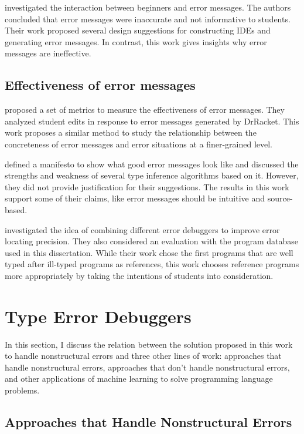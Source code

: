 \documentclass[12pt]{report}	%
\begin{document}
\cite{marceau2011mind} investigated the interaction between
beginners and error messages.
The authors concluded that error messages were
inaccurate and not informative to students.
Their work proposed several design
suggestions for constructing IDEs and generating
error messages.
In contrast, this work gives insights
why error messages are ineffective.

\subsection{Effectiveness of error messages}

\cite{marceau2011measuring} proposed a set of metrics to
measure the effectiveness of
error messages.
They analyzed student edits
in response to error messages generated by DrRacket.
This work proposes a similar method to study
the relationship between
the concreteness of error messages and
error situations at a finer-grained level.

\cite{yang2000improved} defined a manifesto to show
what good error messages look like and discussed
the strengths and weakness of several type inference
algorithms based on it.
However, they did not provide justification
for their suggestions.
The results in this work support some of their claims,
like error messages
should be intuitive and source-based.

\cite{chen2014let} investigated the idea
of combining different error debuggers to improve
error locating precision. They also considered
an evaluation with the program database used
in this dissertation. While their work
chose the first programs that are well typed after
ill-typed programs as references, this work chooses
reference programs more appropriately by taking the
intentions of students into consideration.

\section{Type Error Debuggers}
\label{sec:reivew:debugger}

In this section, I discuss the relation between the solution proposed in this work to handle nonstructural errors and
three other lines of work: approaches that handle nonstructural errors, approaches that don't handle nonstructural errors,
and other applications of machine learning to solve programming language problems.

\subsection{Approaches that Handle Nonstructural Errors}
\end{document}

